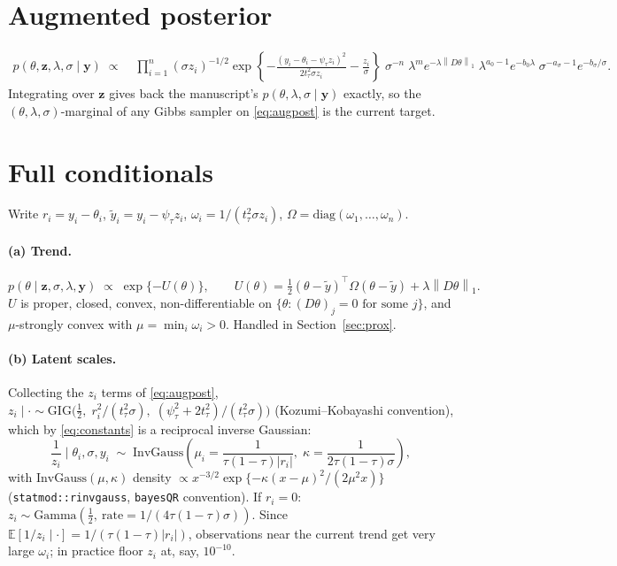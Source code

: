 \documentclass[12pt]{article}
\newcommand{\by}{\bm{y}}
\newcommand{\bz}{\bm{z}}
\newcommand{\norm}[1]{\left\lVert#1\right\rVert}
\newcommand{\InvGauss}{\mathrm{InvGauss}}
\newcommand{\GIG}{\mathrm{GIG}}
\newcommand{\diag}{\mathrm{diag}}
\begin{document}
\section{Augmented posterior}

\begin{align}
    p(\theta,\bz,\lambda,\sigma\mid\by)\;\propto\;&
    \prod_{i=1}^n (\sigma z_i)^{-1/2}
    \exp\!\left\{-\frac{(y_i-\theta_i-\psi_\tau z_i)^2}{2t_\tau^2\sigma z_i}-\frac{z_i}{\sigma}\right\}
    \;\sigma^{-n}\;
    \lambda^{m}e^{-\lambda\norm{D\theta}_1}\;
    \lambda^{a_0-1}e^{-b_0\lambda}\;
    \sigma^{-a_\sigma-1}e^{-b_\sigma/\sigma}.
    \label{eq:augpost}
\end{align}
Integrating over $\bz$ gives back the manuscript's $p(\theta,\lambda,\sigma\mid\by)$ exactly, so the
$(\theta,\lambda,\sigma)$-marginal of any Gibbs sampler on \eqref{eq:augpost} is the current target.

\section{Full conditionals}

Write $r_i=y_i-\theta_i$, $\tilde y_i=y_i-\psi_\tau z_i$,
$\omega_i=1/(t_\tau^2\sigma z_i)$, $\Omega=\diag(\omega_1,\dots,\omega_n)$.

\paragraph{(a) Trend.}
\begin{equation}
    p(\theta\mid\bz,\sigma,\lambda,\by)\;\propto\;\exp\{-U(\theta)\},\qquad
    U(\theta)=\tfrac12(\theta-\tilde y)^\top\Omega(\theta-\tilde y)+\lambda\norm{D\theta}_1 .
    \label{eq:U}
\end{equation}
$U$ is proper, closed, convex, non-differentiable on $\{\theta:(D\theta)_j=0\text{ for some }j\}$,
and $\mu$-strongly convex with $\mu=\min_i\omega_i>0$. Handled in Section~\ref{sec:prox}.

\paragraph{(b) Latent scales.} Collecting the $z_i$ terms of \eqref{eq:augpost},
$z_i\mid\cdot\sim\GIG\big(\tfrac12,\;r_i^2/(t_\tau^2\sigma),\;(\psi_\tau^2+2t_\tau^2)/(t_\tau^2\sigma)\big)$
(Kozumi--Kobayashi convention), which by \eqref{eq:constants} is a reciprocal inverse Gaussian:
\begin{equation}
    \frac1{z_i}\;\Big|\;\theta_i,\sigma,y_i\;\sim\;
    \InvGauss\!\left(\mu_i=\frac{1}{\tau(1-\tau)|r_i|},\;\kappa=\frac{1}{2\tau(1-\tau)\sigma}\right),
    \label{eq:zupdate}
\end{equation}
with $\InvGauss(\mu,\kappa)$ density $\propto x^{-3/2}\exp\{-\kappa(x-\mu)^2/(2\mu^2x)\}$
(\texttt{statmod::rinvgauss}, \texttt{bayesQR} convention). If $r_i=0$:
$z_i\sim\mathrm{Gamma}(\tfrac12,\ \text{rate}=1/(4\tau(1-\tau)\sigma))$.
Since $\mathbb E[1/z_i\mid\cdot]=1/(\tau(1-\tau)|r_i|)$, observations near the current trend get
very large $\omega_i$; in practice floor $z_i$ at, say, $10^{-10}$.
\end{document}
